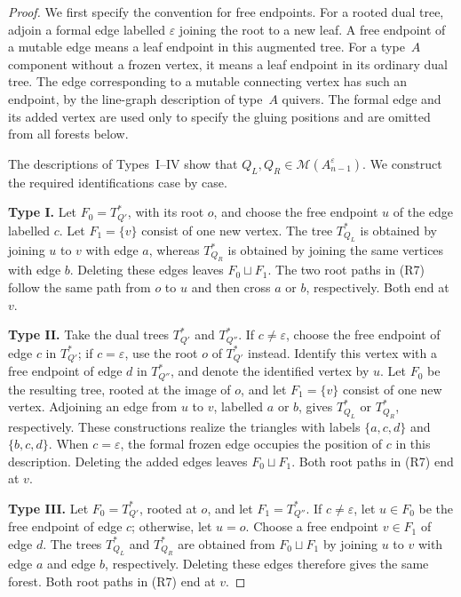 \documentclass[a4paper, 12pt, reqno]{amsart}
\theoremstyle{definition}
\begin{document}
\begin{proof}
We first specify the convention for free endpoints.
For a rooted dual tree, adjoin a formal edge labelled
$\varepsilon$ joining the root to a new leaf.
A free endpoint of a mutable edge means a leaf endpoint
in this augmented tree. For a type~$A$ component without
a frozen vertex, it means a leaf endpoint in its ordinary
dual tree. The edge corresponding to a mutable connecting
vertex has such an endpoint, by the line-graph description
of type~$A$ quivers. The formal edge and its added vertex
are used only to specify the gluing positions and are
omitted from all forests below.

The descriptions of Types~I--IV show that $Q_L,Q_R\in\mathcal M(A_{n-1}^{\varepsilon})$. We construct the required identifications case by case.


\textbf{Type I.} Let $F_0=T_{Q'}^*$, with its root $o$, and choose
the free endpoint $u$ of the edge labelled $c$.
Let $F_1=\{v\}$ consist of one new vertex.
The tree $T_{Q_L}^*$ is obtained by joining $u$ to $v$
with edge $a$, whereas $T_{Q_R}^*$ is obtained by joining
the same vertices with edge $b$.
Deleting these edges leaves $F_0\sqcup F_1$.
The two root paths in {\rm(R7)} follow the same path
from $o$ to $u$ and then cross $a$ or $b$, respectively.
Both end at $v$.



\textbf{Type II.} Take the dual trees $T_{Q'}^*$ and $T_{Q''}^*$. If $c\ne\varepsilon$, choose the free endpoint of
edge $c$ in $T_{Q'}^*$; if $c=\varepsilon$, use the
root $o$ of $T_{Q'}^*$ instead.
Identify this vertex with a free endpoint of edge $d$
in $T_{Q''}^*$, and denote the identified vertex by $u$.
Let $F_0$ be the resulting tree, rooted at the image
of $o$, and let $F_1=\{v\}$ consist of one new vertex. Adjoining an edge from $u$ to $v$, labelled $a$ or $b$,
gives $T_{Q_L}^*$ or $T_{Q_R}^*$, respectively.
These constructions realize the triangles with labels
$\{a,c,d\}$ and $\{b,c,d\}$.
When $c=\varepsilon$, the formal frozen edge occupies
the position of $c$ in this description.
Deleting the added edges leaves $F_0\sqcup F_1$.
Both root paths in {\rm(R7)} end at $v$.



\textbf{Type III.} Let $F_0=T_{Q'}^*$, rooted at $o$, and let $F_1=T_{Q''}^*$. If $c\ne\varepsilon$, let $u\in F_0$ be the free endpoint of edge $c$; otherwise, let $u=o$. Choose a free endpoint $v\in F_1$ of edge $d$. The trees $T_{Q_L}^*$ and $T_{Q_R}^*$ are obtained from $F_0\sqcup F_1$ by joining $u$ to $v$ with edge $a$ and edge $b$, respectively. Deleting these edges therefore gives the same forest. Both root paths in {\rm(R7)} end at $v$.





\end{proof}
\end{document}
